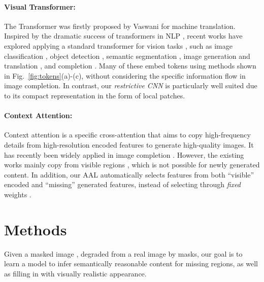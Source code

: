 \documentclass[10pt,twocolumn,letterpaper]{article}
\begin{document}
\vspace{-0.2cm}\paragraph{Visual Transformer:} The Transformer was firstly proposed by Vaswani \etal \cite{Vaswani_NIPS2017_attention} for machine translation. Inspired by the dramatic success of transformers in NLP \cite{devlin2018bert,radford2019language}, recent works have explored applying a standard transformer for vision tasks \cite{liu2021Swin}, such as image classification \cite{chen2020generative,dosovitskiy2020image,he2021masked}, object detection \cite{carion2020end,zhu2020deformable}, semantic segmentation \cite{wu2020visual,SETR}, image generation and translation \cite{esser2020taming,chen2020generative,hudson2021gansformer,jiang2021transgan}, and completion \cite{Liu_2021_FuseFormer,Wan_2021_ICCV}. Many of these embed tokens using methods shown in Fig.~\ref{fig:tokens}(a)-(c), without considering the specific information flow in image completion. In contrast, our \emph{restrictive CNN} is particularly well suited due to its compact representation in the form of local patches. 

\vspace{-0.2cm}\paragraph{Context Attention:} Context attention \cite{yu2018generative} is a specific cross-attention that aims to copy high-frequency details from high-resolution encoded features to generate high-quality images. It has recently been widely applied in image completion  \cite{yu2018generative,song2018contextual,yan2018shift,Zheng_2019_CVPR,yi2020contextual,zeng2021generative}. However, the existing works mainly copy from visible regions \cite{yu2018generative,song2018contextual,yan2018shift,yi2020contextual,zeng2021generative}, which 
is not possible for newly generated content. In addition, our AAL automatically selects features from both ``visible'' encoded and ``missing'' generated features, instead of selecting through \emph{fixed} weights \cite{Zheng_2019_CVPR}. 

\section{Methods}
\label{sec:method}

Given a masked image , degraded from a real image  by masks, our goal is to learn a model  to infer semantically reasonable content for missing regions, as well as filling in with visually realistic appearance. 
\end{document}
